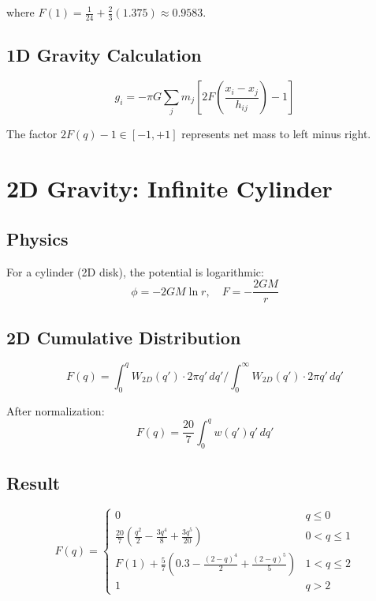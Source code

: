 \documentclass[12pt]{article}
\begin{document}
where $F(1) = \frac{1}{24} + \frac{2}{3}(1.375) \approx 0.9583$.

\subsection{1D Gravity Calculation}
\begin{equation}
\boxed{g_i = -\pi G \sum_j m_j \left[2F\left(\frac{x_i - x_j}{h_{ij}}\right) - 1\right]}
\end{equation}

The factor $2F(q) - 1 \in [-1, +1]$ represents net mass to left minus right.

\section{2D Gravity: Infinite Cylinder}

\subsection{Physics}
For a cylinder (2D disk), the potential is logarithmic:
\begin{equation}
\phi = -2GM \ln r, \quad F = -\frac{2GM}{r}
\end{equation}

\subsection{2D Cumulative Distribution}
\begin{equation}
F(q) = \int_0^q W_{2D}(q') \cdot 2\pi q' \, dq' \Big/ \int_0^\infty W_{2D}(q') \cdot 2\pi q' \, dq'
\end{equation}

After normalization:
\begin{equation}
F(q) = \frac{20}{7} \int_0^q w(q') q' \, dq'
\end{equation}

\subsection{Result}
\begin{equation}
F(q) =
\begin{cases}
0 & q \leq 0 \\[4pt]
\frac{20}{7}\left(\frac{q^2}{2} - \frac{3q^4}{8} + \frac{3q^5}{20}\right) & 0 < q \leq 1 \\[4pt]
F(1) + \frac{5}{7}\left(0.3 - \frac{(2-q)^4}{2} + \frac{(2-q)^5}{5}\right) & 1 < q \leq 2 \\[4pt]
1 & q > 2
\end{cases}
\end{equation}
\end{document}
